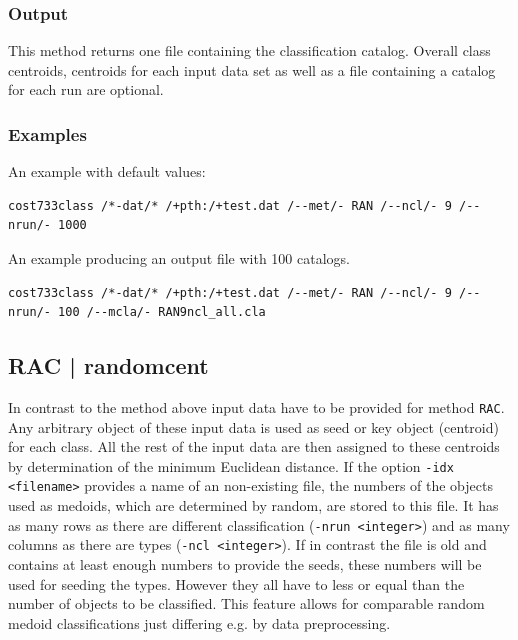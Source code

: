 \documentclass[12pt, oneside, a4paper, headsepline, plainheadsepline]{scrbook}
\begin{document}
\subsubsection*{Output}
This method returns one file containing the classification catalog. 
Overall class centroids, centroids for each input data set as well as a file containing a catalog for each run are optional.

\subsubsection*{Examples}
An example with default values:
\begin{lstlisting}
cost733class /*-dat/* /+pth:/+test.dat /--met/- RAN /--ncl/- 9 /--nrun/- 1000 
\end{lstlisting}
An example producing an output file with 100 catalogs.
\begin{lstlisting}
cost733class /*-dat/* /+pth:/+test.dat /--met/- RAN /--ncl/- 9 /--nrun/- 100 /--mcla/- RAN9ncl_all.cla
\end{lstlisting}

\subsection{RAC | randomcent}
In contrast to the method above input data have to be provided for method \verb+RAC+. Any arbitrary 
object of these input data is used as seed or key object (centroid) for each class. All the rest
of the input data are then assigned to these centroids by determination of the minimum Euclidean distance.
If the option \verb+-idx <filename>+ provides a name of an non-existing file, the numbers of the objects used as medoids, which are determined by random, are stored to this file. It has as many rows as there are different classification (\verb+-nrun <integer>+) and as many columns as there are types (\verb+-ncl <integer>+).
If in contrast the file is old and contains at least enough numbers to provide the seeds, these numbers will be used for seeding the types. However they all have to less or equal than the number of objects to be classified. This feature allows for comparable random medoid classifications just differing e.g. by data preprocessing.
\end{document}
